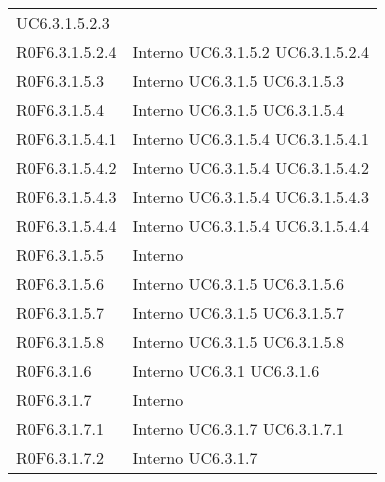 \begin{longtable}{p{2.5cm}!{\VRule[1pt]}p{2.5cm}}
 \newline UC6.3.1.5.2.3
 \\
R0F6.3.1.5.2.4 & Interno \newline UC6.3.1.5.2
 \newline UC6.3.1.5.2.4
 \\
R0F6.3.1.5.3 & Interno \newline UC6.3.1.5
 \newline UC6.3.1.5.3
 \\
R0F6.3.1.5.4 & Interno \newline UC6.3.1.5
 \newline UC6.3.1.5.4
 \\
R0F6.3.1.5.4.1 & Interno \newline UC6.3.1.5.4
 \newline UC6.3.1.5.4.1
 \\
R0F6.3.1.5.4.2 & Interno \newline UC6.3.1.5.4
 \newline UC6.3.1.5.4.2
 \\
R0F6.3.1.5.4.3 & Interno \newline UC6.3.1.5.4
 \newline UC6.3.1.5.4.3
 \\
R0F6.3.1.5.4.4 & Interno \newline UC6.3.1.5.4
 \newline UC6.3.1.5.4.4
 \\
R0F6.3.1.5.5 & Interno \\
R0F6.3.1.5.6 & Interno \newline UC6.3.1.5
 \newline UC6.3.1.5.6
 \\
R0F6.3.1.5.7 & Interno \newline UC6.3.1.5
 \newline UC6.3.1.5.7
 \\
R0F6.3.1.5.8 & Interno \newline UC6.3.1.5
 \newline UC6.3.1.5.8
 \\
R0F6.3.1.6 & Interno \newline UC6.3.1
 \newline UC6.3.1.6
 \\
R0F6.3.1.7 & Interno \\
R0F6.3.1.7.1 & Interno \newline UC6.3.1.7
 \newline UC6.3.1.7.1
 \\
R0F6.3.1.7.2 & Interno \newline UC6.3.1.7

\end{longtable}
